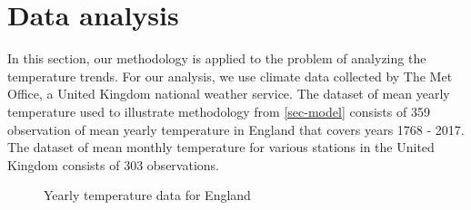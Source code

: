 \newpage
\section{Data analysis}\label{sec-data}
In this section, our methodology is applied to the problem of analyzing the temperature trends. For our analysis, we use climate data collected by The Met Office, a United Kingdom national weather service. The dataset of mean yearly temperature used to illustrate methodology from \ref{sec-model} consists of 359 observation of mean yearly temperature in England that covers years 1768 - 2017. The dataset of mean monthly temperature for various stations in the United Kingdom consists of 303 observations. 

\begin{figure}[ht!]
\centering

\caption{Yearly temperature data for England\label{yearly_data}}
\end{figure}

